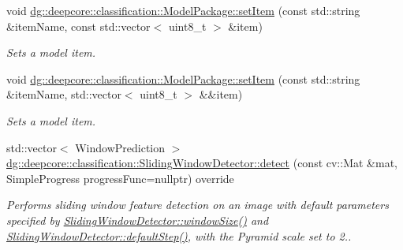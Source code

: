 \begin{DoxyCompactItemize}
void \hyperlink{group___classification_module_ga8f03404f9b535950e5686b4003b20280}{dg\+::deepcore\+::classification\+::\+Model\+Package\+::set\+Item} (const std\+::string \&item\+Name, const std\+::vector$<$ uint8\+\_\+t $>$ \&item)
\begin{DoxyCompactList}\small\item\em Sets a model item. \end{DoxyCompactList}\item 
void \hyperlink{group___classification_module_ga17cdbbe5928308eb299844f4df1455ad}{dg\+::deepcore\+::classification\+::\+Model\+Package\+::set\+Item} (const std\+::string \&item\+Name, std\+::vector$<$ uint8\+\_\+t $>$ \&\&item)
\begin{DoxyCompactList}\small\item\em Sets a model item. \end{DoxyCompactList}\item 
std\+::vector$<$ Window\+Prediction $>$ \hyperlink{group___classification_module_gaf9e9535cf11f5961389a5271248062cb}{dg\+::deepcore\+::classification\+::\+Sliding\+Window\+Detector\+::detect} (const cv\+::\+Mat \&mat, Simple\+Progress progress\+Func=nullptr) override
\begin{DoxyCompactList}\small\item\em Performs sliding window feature detection on an image with default parameters specified by \hyperlink{group___classification_module_ga35c268eb743bfbfb5d77d30ddbcc48e5}{Sliding\+Window\+Detector\+::window\+Size()} and \hyperlink{group___classification_module_ga8e430c585fe3d3bcba00c21f418752d2}{Sliding\+Window\+Detector\+::default\+Step()}, with the Pyramid scale set to 2.. \end{DoxyCompactList}\end{DoxyCompactItemize}
